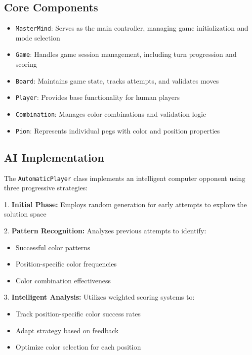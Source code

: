 \documentclass[english,a4paper]{article}
\begin{document}
\subsection{Core Components}
\begin{itemize}
\item \texttt{MasterMind}: Serves as the main controller, managing game initialization and mode selection
\item \texttt{Game}: Handles game session management, including turn progression and scoring
\item \texttt{Board}: Maintains game state, tracks attempts, and validates moves
\item \texttt{Player}: Provides base functionality for human players
\item \texttt{Combination}: Manages color combinations and validation logic
\item \texttt{Pion}: Represents individual pegs with color and position properties
\end{itemize}

\subsection{AI Implementation}
The \texttt{AutomaticPlayer} class implements an intelligent computer opponent using three progressive strategies:

1. \textbf{Initial Phase:} Employs random generation for early attempts to explore the solution space

2. \textbf{Pattern Recognition:} Analyzes previous attempts to identify:
\begin{itemize}
\item Successful color patterns
\item Position-specific color frequencies
\item Color combination effectiveness
\end{itemize}

3. \textbf{Intelligent Analysis:} Utilizes weighted scoring systems to:
\begin{itemize}
\item Track position-specific color success rates
\item Adapt strategy based on feedback
\item Optimize color selection for each position
\end{itemize}

\end{document}
